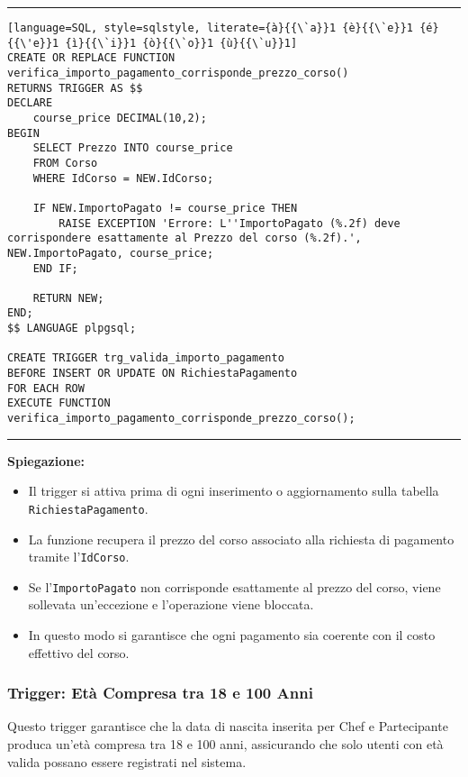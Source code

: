 \noindent\rule{\textwidth}{0.4pt}
\begin{lstlisting}[language=SQL, style=sqlstyle, literate={à}{{\`a}}1 {è}{{\`e}}1 {é}{{\'e}}1 {ì}{{\`i}}1 {ò}{{\`o}}1 {ù}{{\`u}}1]
CREATE OR REPLACE FUNCTION verifica_importo_pagamento_corrisponde_prezzo_corso()
RETURNS TRIGGER AS $$
DECLARE
    course_price DECIMAL(10,2);
BEGIN
    SELECT Prezzo INTO course_price
    FROM Corso
    WHERE IdCorso = NEW.IdCorso;

    IF NEW.ImportoPagato != course_price THEN
        RAISE EXCEPTION 'Errore: L''ImportoPagato (%.2f) deve corrispondere esattamente al Prezzo del corso (%.2f).', NEW.ImportoPagato, course_price;
    END IF;

    RETURN NEW;
END;
$$ LANGUAGE plpgsql;

CREATE TRIGGER trg_valida_importo_pagamento
BEFORE INSERT OR UPDATE ON RichiestaPagamento
FOR EACH ROW
EXECUTE FUNCTION verifica_importo_pagamento_corrisponde_prezzo_corso();
\end{lstlisting}
\noindent\rule{\textwidth}{0.4pt}

\textbf{Spiegazione:}
\begin{itemize}
    \item Il trigger si attiva prima di ogni inserimento o aggiornamento sulla tabella \texttt{RichiestaPagamento}.
    \item La funzione recupera il prezzo del corso associato alla richiesta di pagamento tramite l'\texttt{IdCorso}.
    \item Se l'\texttt{ImportoPagato} non corrisponde esattamente al prezzo del corso, viene sollevata un'eccezione e l'operazione viene bloccata.
    \item In questo modo si garantisce che ogni pagamento sia coerente con il costo effettivo del corso.
\end{itemize}

\subsubsection{Trigger: Età Compresa tra 18 e 100 Anni}

Questo trigger garantisce che la data di nascita inserita per Chef e Partecipante produca un'età compresa tra 18 e 100 anni, assicurando che solo utenti con età valida possano essere registrati nel sistema.

